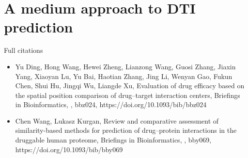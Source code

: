 \documentclass[10pt]{beamer}
\begin{document}
\begin{frame}{}
	
\end{frame}

\section{A medium approach to DTI prediction}

\begin{frame}{Full citations}
	\footnotesize
	\begin{itemize}
		\item Yu Ding, Hong Wang, Hewei Zheng, Lianzong Wang, Guosi Zhang, Jiaxin Yang, Xiaoyan Lu, Yu Bai, Haotian Zhang, Jing Li, Wenyan Gao, Fukun Chen, Shui Hu, Jingqi Wu, Liangde Xu, Evaluation of drug efficacy based on the spatial position comparison of drug–target interaction centers, Briefings in Bioinformatics, , bbz024, https://doi.org/10.1093/bib/bbz024
		\item Chen Wang, Lukasz Kurgan, Review and comparative assessment of similarity-based methods for prediction of drug–protein interactions in the druggable human proteome, Briefings in Bioinformatics, , bby069, https://doi.org/10.1093/bib/bby069
	\end{itemize}
\end{frame}
\end{document}
